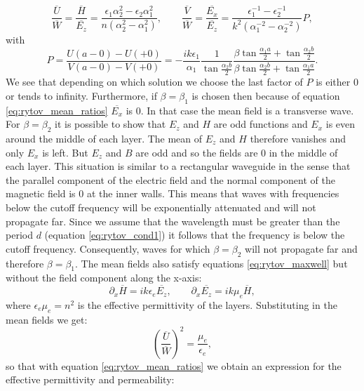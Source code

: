 \begin{equation}
    \label{eq:rytov_mean_ratios}
    \frac{\overline{U}}{\overline{W}} = \frac{\overline{H}}{\overline{E_z}} = \frac{\epsilon_1 \alpha_2^2 - \epsilon_2 \alpha_1^2}{n\left(\alpha_2^2-\alpha_1^2 \right)},
    \qquad
    \frac{\overline{V}}{\overline{W}} = \frac{\overline{E_x}}{\overline{E_z}} = \frac{\epsilon_1^{-1} - \epsilon_2^{-1}}{k^2\left(\alpha_1^{-2} - \alpha_2^{-2} \right)}P,
\end{equation}
with
\begin{equation}
    P = \frac{U(a-0)-U(+0)}{V(a-0)-V(+0)} = -\frac{ik\epsilon_1}{\alpha_1}\frac{1}{\tan \frac{\alpha_2 b}{2}}\frac{\beta \tan \frac{\alpha_1 a}{2} + \tan \frac{\alpha_2 b}{2}}{\beta \tan \frac{\alpha_2 b}{2} + \tan \frac{\alpha_1 a}{2}}.
\end{equation}
We see that depending on which solution we choose the last factor of $P$ is either $0$ or tends to infinity. Furthermore, if $\beta = \beta_1$ is chosen then because of equation \ref{eq:rytov_mean_ratios} $\overline{E_x}$ is $0$. In that case the mean field is a transverse wave. For $\beta = \beta_2$ it is possible to show that $E_z$ and $H$ are odd functions and $E_x$ is even around the middle of each layer. The mean of $E_z$ and $H$ therefore vanishes and only $E_x$ is left. But $E_z$ and $B$ are odd and so the fields are $0$ in the middle of each layer. This situation is similar to a rectangular waveguide in the sense that the parallel component of the electric field and the normal component of the magnetic field is $0$ at the inner walls. This means that waves with frequencies below the cutoff frequency will be exponentially attenuated and will not propagate far. Since we assume that the wavelength must be greater than the period $d$ (equation \ref{eq:rytov_cond1}) it follows that the frequency is below the cutoff frequency. Consequently, waves for which $\beta = \beta_2$ will not propagate far and therefore $\beta = \beta_1$. The mean fields also satisfy equations \ref{eq:rytov_maxwell} but without the field component along the x-axis:
\begin{equation}
    \label{eq:rytov_maxwell_reduced}
    \partial_x \overline{H} = ik \epsilon_e \overline{E_z},
    \qquad
    \partial_x \overline{E_z} = ik \mu_e \overline{H},
\end{equation}
where $\epsilon_e \mu_e =n^2$ is the effective permittivity of the layers. Substituting in the mean fields we get:
\begin{equation}
    \left(\frac{\overline{U}}{\overline{W}}\right)^2 = \frac{\mu_e}{\epsilon_e}, 
\end{equation} so that with equation \ref{eq:rytov_mean_ratios} we obtain an expression for the effective permittivity and permeability:
